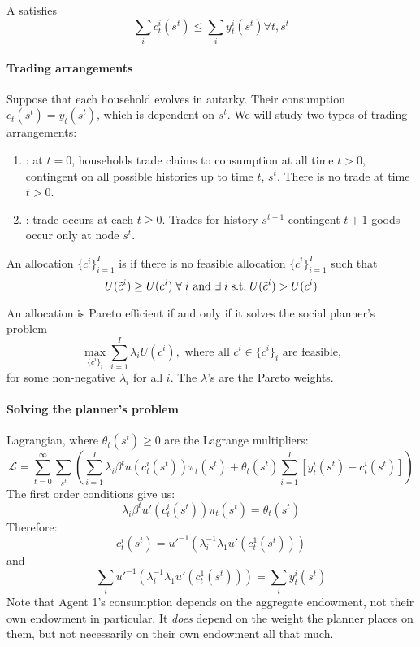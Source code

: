 \documentclass[10pt]{article}
\begin{document}
\begin{definition}
	A  satisfies
	\[
	\sum_i c_t^i(s^t) \le \sum_i y_t^i(s^t) \forall t, s^t
	\]
\end{definition}

\paragraph{Trading arrangements} Suppose that each household evolves in autarky. Their consumption $c_t(s^t) = y_t(s^t)$, which is dependent on $s^t$. We will study two types of trading arrangements:
\begin{enumerate}
	\item {}: at $t = 0$, households trade claims to consumption at all time $t > 0$, contingent on all possible histories up to time $t$, $s^t$. There is no trade at time $t > 0$.
	\item {}: trade occurs at each $t \ge 0$. Trades for history $s^{t+1}$-contingent $t+1$ goods occur only at node $s^t$.
\end{enumerate}

\begin{definition}
	An allocation $\{c^i\}_{i=1}^I$ is  if there is no feasible allocation $\{\tilde{c}^i\}_{i=1}^I$ such that
	\[
	U(\tilde{c}^i) \ge U(c^i) \forall i \text{ and } \exists i \st U(\tilde{c}^i) > U(c^i) 
	\]
\end{definition}

\begin{proposition}
	An allocation is Pareto efficient if and only if it solves the social planner's problem
	\[
	\max_{\{c^i\}_i} \sum_{i=1}^I \lambda_i U(c^i), \text{ where all } c^i \in \{c^i\}_i \text{ are feasible,}
	\]
	for some non-negative $\lambda_i$ for all $i$. The $\lambda$'s are the Pareto weights.
\end{proposition}

\paragraph{Solving the planner's problem} Lagrangian, where $\theta_t(s^t) \ge 0$ are the Lagrange multipliers:
\[
\mathcal{L} = \sum_{t=0}^\infty \sum_{s^t} \left( \sum_{i=1}^I \lambda_i \beta^t u(c_t^i(s^t)) \pi_t(s^t) + \theta_t(s^t) \sum_{i=1}^I [y_t^i(s^t) - c^i_t(s^t)] \right)
\]
The first order conditions give us:
\[
\lambda_i \beta^t u'(c_t^i (s^t)) \pi_t(s^t) = \theta_t(s^t)
\]
Therefore:
\[
c_t^i(s^t) = u'^{-1}(\lambda_i^{-1} \lambda_1 u'(c_t^1(s^t)))
\]
and
\[
\sum_i u'^{-1}(\lambda_i^{-1} \lambda_1 u'(c_t^1(s^t))) = \sum_i y_t^i(s^t)
\]
Note that Agent 1's consumption depends on the aggregate endowment, not their own endowment in particular. It \emph{does} depend on the weight the planner places on them, but not necessarily on their own endowment all that much.
\end{document}
